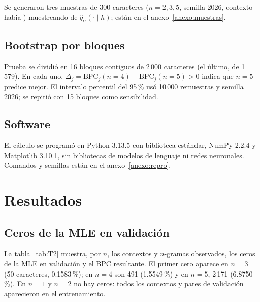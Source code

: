 \documentclass[11pt,letterpaper]{article}
\newcommand{\BPC}{\text{BPC}}
\begin{document}
Se generaron tres muestras de 300 caracteres ($n=2,3,5$, semilla 2026, contexto \guillemotleft{}habia \guillemotright{}) muestreando de $\hat q_\alpha(\cdot\mid h)$; están en el anexo~\ref{anexo:muestras}.

\subsection{Bootstrap por bloques}

Prueba se dividió en 16 bloques contiguos de 2\,000 caracteres (el último, de 1\,579). En cada uno, $\Delta_j=\BPC_j(n=4)-\BPC_j(n=5)>0$ indica que $n=5$ predice mejor. El intervalo percentil del 95\,\% usó 10\,000 remuestras y semilla 2026; se repitió con 15 bloques como sensibilidad.

\subsection{Software}

El cálculo se programó en Python 3.13.5 con biblioteca estándar, NumPy 2.2.4 y Matplotlib 3.10.1, sin bibliotecas de modelos de lenguaje ni redes neuronales. Comandos y semillas están en el anexo~\ref{anexo:repro}.

\section{Resultados}\label{sec:resultados}

\subsection{Ceros de la MLE en validación}

La tabla~\ref{tab:T2} muestra, por $n$, los contextos y $n$-gramas observados, los ceros de la MLE en validación y el BPC resultante. El primer cero aparece en $n=3$ (50 caracteres, 0.1583\,\%); en $n=4$ son 491 (1.5549\,\%) y en $n=5$, 2\,171 (6.8750\,\%). En $n=1$ y $n=2$ no hay ceros: todos los contextos y pares de validación aparecieron en el entrenamiento.
\end{document}
